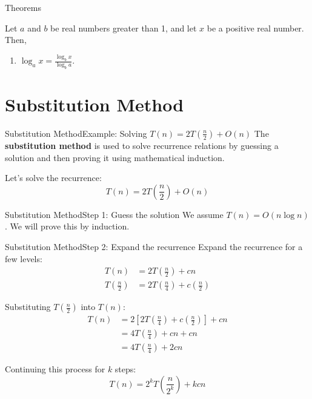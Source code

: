 \documentclass[aspectratio=169]{beamer}
\begin{document}
\begin{frame}{Theorems}
    \begin{theorem}\label{theo:three}
        Let $a$ and $b$ be real numbers greater than 1, and let $x$ be a positive real number. Then,
        \begin{enumerate}
         \item $\log_a x = \frac{\log_b x}{\log_b a}$.
        \end{enumerate}
    \end{theorem}
\end{frame}

\section{Substitution Method}

\begin{frame}{Substitution Method}{Example: Solving $T(n) = 2T(\frac{n}{2}) + O(n)$}
    The \textbf{substitution method} is used to solve recurrence relations by guessing a solution and then proving it using mathematical induction.

    Let's solve the recurrence:
    \begin{equation*}
        T(n) = 2T \left(\frac{n}{2}\right) + O(n)
    \end{equation*}
\end{frame}

\begin{frame}{Substitution Method}{Step 1: Guess the solution}
    We assume $T(n) = O(n \log n)$. We will prove this by induction.
\end{frame}

\begin{frame}{Substitution Method}{Step 2: Expand the recurrence}
    Expand the recurrence for a few levels:
    \begin{align*}
    T(n) &= 2T\left(\frac{n}{2}\right) + cn \\
    T\left(\frac{n}{2}\right) &= 2T\left(\frac{n}{4}\right) + c\left(\frac{n}{2}\right)
    \end{align*}

    Substituting $T\left(\frac{n}{2}\right)$ into $T(n)$:
    \begin{align*}
    T(n) &= 2\left[ 2T\left(\frac{n}{4}\right) + c\left(\frac{n}{2}\right) \right] + cn \\
         &= 4T\left(\frac{n}{4}\right) + cn + cn \\
         &= 4T\left(\frac{n}{4}\right) + 2cn
    \end{align*}

    Continuing this process for $k$ steps:
    \begin{equation*}
    T(n) = 2^k T\left(\frac{n}{2^k}\right) + kcn
    \end{equation*}
\end{frame}
\end{document}
